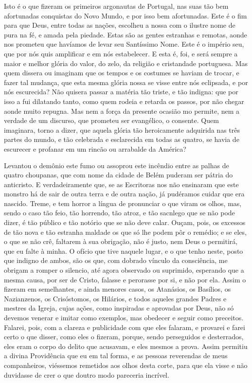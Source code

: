 Isto é o que fizeram os primeiros argonautas de Portugal, nas suas tão
bem afortunadas conquistas do Novo Mundo, e por isso bem afortunadas.
Este é o fim para que Deus, entre todas as nações, escolheu a nossa com
o ilustre nome de pura na fé, e amada pela piedade. Estas são as gentes
estranhas e remotas, aonde nos prometeu que havíamos de levar seu
Santíssimo Nome. Este é o império seu, que por nós quis amplificar e em
nós estabelecer. E esta é, foi, e será sempre a maior e melhor glória do
valor, do zelo, da religião e cristandade portuguesa. Mas quem dissera
ou imaginam que os tempos e os costumes se haviam de trocar, e fazer tal
mudança, que esta mesma glória nossa se visse entre nós eclipsada, e por
nós escurecida? Não quisera passar a matéria tão triste, e tão indigna:
que por isso a fui dilatando tanto, como quem rodeia e retarda os
passos, por não chegar aonde muito repugna. Mas nem a força da
presente ocasião mo permite, nem a verdade de um discurso, que prometeu
ser evangélico, o consente. Quem imaginara, torno a dizer, que aquela
glória tão heroicamente adquirida nas três partes do mundo, e tão
celebrada e esclarecida em todas as quatro, se havia de escurecer e
profanar em um rincão ou arrabalde da América?

Levantou o demônio este fumo ou assoprou este incêndio entre as palhas
de quatro choupanas, que com nome da cidade de Belém puderam ser pátria
do anticristo. E verdadeiramente que, se as Escritoras nos não ensinaram
que este monstro há de sair de outra terra e de outra nação, já
pudéramos cuidar que era nascido. Treme, e tem horror a língua de
pronunciar o que viram os olhos, mas, sendo o caso tão feio, tão
horrendo, tão atroz, e tão sacnlego que se não pode dizer, é tão público
e tão notório que se não deve calar. Ouçam, pois, os excessos de tão
nova e tão estranha maldade os que só lhe podem pôr o remédio; e se eles,
o que se não crê, faltarem à sua obrigação, não é justo, nem Deus o
permitirá, que eu falte à minha. O ofício que tive naquele lugar, e o
que tenho neste, posto que indigno de ambos, são os que, com dobrado
vínculo da consciência, me obrigam a romper o silencio, até agora
observado ou suprimido, esperando que a mesma causa, por ser de Cristo,
falasse e perorasse por si, e não por ela. Assim o fizeram em
semelhantes, e ainda menores casos, os Atanásios, os Basílios, os
Nazianzenos, os Crisóstomos, os Hilários, e todos aqueles grandes Padres
e mestres da Igreja, cujas ações, como inspiradas e aprovadas por Deus,
não só devemos venerar e imitar como exemplos, mas obedecer e seguir
como preceitos. Falarei, pois, com a clareza e publicidade com que eles
falaram, e provarei e farei certo o que disser, como eles o fizeram,
porque, sendo perseguidos e desterrados, eles eram o corpo do delito que
acusavam, e eles mesmos a prova. Assim permitiu a divina Providência que
eu em tal forma, e as pessoas reverendas de meus companheiros, viéssemos
remetidos aos olhos desta corte, para que ela visse e não duvidasse de
crer o que doutro modo pareceria incrível.

